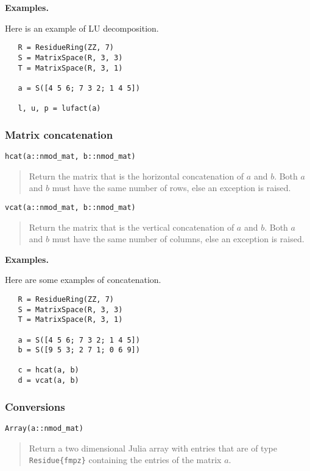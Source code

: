 \documentclass[a4paper,10pt]{article}
\newcommand{\code}{\lstinline}
\newcommand{\desc}[1]{\vspace{-3mm}\begin{quote}#1\end{quote}}
\begin{document}
{{\textbf{Examples.}

Here is an example of LU decomposition.

\begin{lstlisting}
   R = ResidueRing(ZZ, 7)
   S = MatrixSpace(R, 3, 3)
   T = MatrixSpace(R, 3, 1)

   a = S([4 5 6; 7 3 2; 1 4 5])
  
   l, u, p = lufact(a)
\end{lstlisting}

\subsubsection{Matrix concatenation}

\begin{lstlisting}
hcat(a::nmod_mat, b::nmod_mat)
\end{lstlisting}

\desc{Return the matrix that is the horizontal concatenation of $a$ and $b$.
Both $a$ and $b$ must have the same number of rows, else an exception is raised.}

\begin{lstlisting}
vcat(a::nmod_mat, b::nmod_mat)
\end{lstlisting}

\desc{Return the matrix that is the vertical concatenation of $a$ and $b$.
Both $a$ and $b$ must have the same number of columns, else an exception is raised.}

\textbf{Examples.}

Here are some examples of concatenation.

\begin{lstlisting}
   R = ResidueRing(ZZ, 7)
   S = MatrixSpace(R, 3, 3)
   T = MatrixSpace(R, 3, 1)

   a = S([4 5 6; 7 3 2; 1 4 5])
   b = S([9 5 3; 2 7 1; 0 6 9])
  
   c = hcat(a, b)
   d = vcat(a, b)
\end{lstlisting}

\subsubsection{Conversions}

\begin{lstlisting}
Array(a::nmod_mat)
\end{lstlisting}

\desc{Return a two dimensional Julia array with entries that are of type
\code|Residue{fmpz}| containing the entries of the matrix $a$.} 

}}
\end{document}
